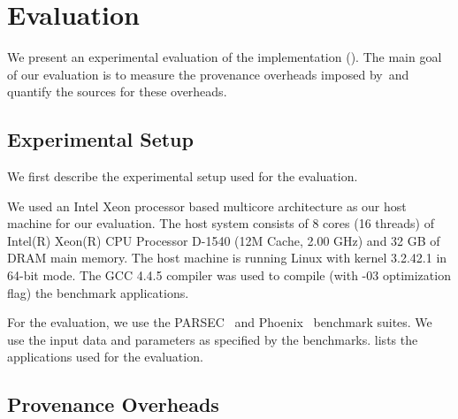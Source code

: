 \section{Evaluation}
\label{sec:evaluation}

We present an experimental evaluation of the \projecttitle implementation (). The main goal of our evaluation is to measure the provenance overheads imposed by~\projecttitle and quantify the sources for these overheads.

\subsection{Experimental Setup}
We first describe the experimental setup used for the evaluation.

 We used an Intel Xeon processor based
multicore architecture as our host machine for our evaluation. The
host system consists of 8 cores (16 threads) of Intel(R) Xeon(R) CPU Processor D-1540
(12M Cache, 2.00 GHz) and 32 GB of DRAM main memory. The host
machine is running Linux with kernel 3.2.42.1 in 64-bit mode.
The GCC 4.4.5 compiler was used to
compile (with -$03$ optimization flag) the benchmark applications.

  For the evaluation, we use the PARSEC~\cite{parsec} and
Phoenix~\cite{phoenix} benchmark suites. We use
the input data and parameters as specified by the
benchmarks.  lists the applications used for the
evaluation.

%

\subsection{Provenance Overheads}



